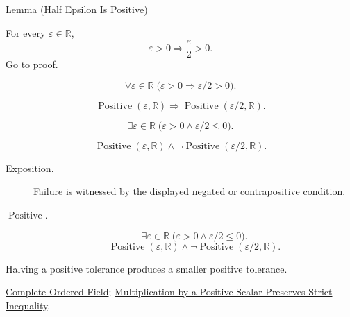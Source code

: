 \begin{lemmabox}{Lemma (Half Epsilon Is Positive)}
\begin{lemma}
\label{lem:half-epsilon-is-positive}
For every $\varepsilon\in\mathbb{R}$,
\[
  \varepsilon>0
  \Longrightarrow
  \frac{\varepsilon}{2}>0.
\]
\hyperref[prf:half-epsilon-is-positive]{Go to proof.}
\end{lemma}
\end{lemmabox}
\begin{remark*}
\[
\forall \varepsilon\in\mathbb{R}\;\bigl(\varepsilon>0\Longrightarrow \varepsilon/2>0\bigr).
\]
\end{remark*}
\begin{remark*}
\[
\operatorname{Positive}(\varepsilon,\mathbb{R})\Longrightarrow
\operatorname{Positive}(\varepsilon/2,\mathbb{R}).
\]
\end{remark*}
\begin{remark*}
\[
\exists\varepsilon\in\mathbb{R}\;\bigl(\varepsilon>0\land \varepsilon/2\leq 0\bigr).
\]
\end{remark*}
\begin{remark*}
\[
\operatorname{Positive}(\varepsilon,\mathbb{R})\land\neg\operatorname{Positive}(\varepsilon/2,\mathbb{R}).
\]
\end{remark*}

\begin{remark*}
\begin{description}
  \item[Exposition.]
  Failure is witnessed by the displayed negated or contrapositive condition.

  \item[\(\operatorname{Positive}.\)]
  \[
\exists\varepsilon\in\mathbb{R}\;\bigl(\varepsilon>0\land \varepsilon/2\leq 0\bigr).
\]
\[
\operatorname{Positive}(\varepsilon,\mathbb{R})\land\neg\operatorname{Positive}(\varepsilon/2,\mathbb{R}).
\]
\end{description}
\end{remark*}
\begin{remark*}[Interpretation]
Halving a positive tolerance produces a smaller positive tolerance.
\end{remark*}
\begin{dependencies}
\hyperref[def:real-ordered-field]{Complete Ordered Field};
\hyperref[thm:ineq-multiply-positive]{Multiplication by a Positive Scalar Preserves Strict Inequality}.
\end{dependencies}
